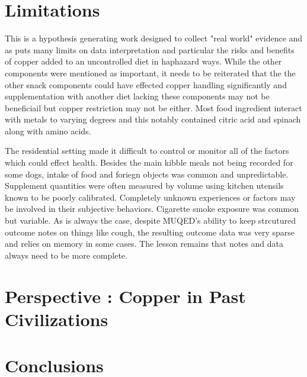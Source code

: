 \section{Limitations}
This is a hypothesis generating work designed to collect
"real world" evidence and as puts many limits on data interpretation
and particular the risks and benefits of copper added to an uncontrolled
diet in haphazard ways.
While the other components were mentioned as important,
it needs to be reiterated that the 
the other snack components could have effected copper handling
significantly and supplementation with another diet lacking
these components may not be beneficiail but copper restriction
may not be either. Most food ingredient interact with metals 
to varying degrees and this notably contained citric acid
and spinach along with amino acids. 

The residential setting made it difficult to control or monitor
all of the factors which could effect health. Besides the main
kibble meals not being recorded for some dogs, intake of food
and foriegn objects was common and unpredictable. 
Supplement quantities were often measured by volume using kitchen
utensils known to be poorly calibrated. 
Completely unknown experiences or factors may be involved in their
subjective behaviors.  Cigarette smoke exposure was common
but variable.
As is always the case, despite MUQED's ability to keep strcutured
outcome notes on things like cough, the resulting outcome
data was very sparse and relies on memory in some cases.
The lesson remains that notes and data always need to be
more complete. 


\section{Perspective : Copper in Past Civilizations }








\section{Conclusions}

